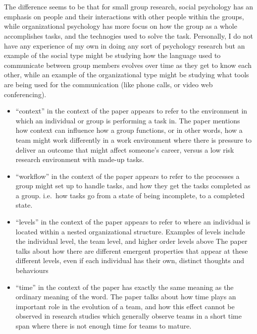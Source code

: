 \documentclass[letterpaper,12pt]{article}
\begin{document}
  \setcounter{section}{0}
  \section{}
  The difference seems to be that for small group research, social psychology has an emphasis on
  people and their interactions with other people within the groups, while organizational psychology
  has more focus on how the group as a whole accomplishes tasks, and the technogies used to solve the task.
  Personally, I do not have any experience of my own in doing any sort of psychology research but an
  example of the social type might be studying how the language used to communicate between group members
  evolves over time as they get to know each other, while an example of the organizational type might be
  studying what tools are being used for the communication (like phone calls, or video web conferencing).

  \begin{itemize}
    \item ``context'' in the context of the paper appears to refer to the
environment in which an individual or group is  performing a task in. The paper
mentions how context can influence how a group functions, or in other words, how
a team might work differently in a work environment where there is pressure to
deliver an outcome that might affect someone's career, versus a low risk
research environment with made-up tasks.
    \item ``workflow'' in the context of the paper appears to refer to the
          processes a group might set up to handle tasks, and how they get the tasks
          completed as a group. i.e.\ how tasks go from a state of being incomplete, to a
          completed state.
    \item ``levels'' in the context of the paper appears to refer to where an individual is located within a nested
          organizational structure. Examples of levels include the individual level, the team level, and higher order levels above
          The paper talks about how there are different emergent properties that appear at these different levels, even if
          each individual has their own, distinct thoughts and behaviours
    \item ``time'' in the context of the paper has exactly the same meaning as the ordinary meaning of the word. The paper
          talks about how time plays an important role in the evolution of a team, and how this effect cannot be observed in
          research studies which generally observe teams in a short time span where there is not enough time for teams to mature.
  \end{itemize}
\end{document}
